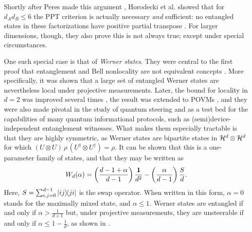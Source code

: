 		Shortly after Peres made this argument \cite{peres_1996_ppt}, Horodecki et al. showed that for $d_A d_B \leq 6$ the PPT criterion is actually necessary \emph{and} sufficient: no entangled states in these factorizations have positive partial transpose \cite{horodecki_1996_ppt}. For larger dimensions, though, they also prove this is not always true; except under special circumstances.
	
		One such special case is that of \emph{Werner states}. They were central to the first proof that entanglement and Bell nonlocality are not equivalent concepts \cite{werner_1989}. More specifically, it was shown that a large set of entangled Werner states are nevertheless local under projective measurements. Later, the bound for locality in $d=2$ was improved several times \cite{acin_2006_grothendieck,vertesi_2008_moreefficient,hirsch_2017_betterlocalhidden}, the result was extended to POVMs \cite{barrett_2002_povmslocality}, and they were also made pivotal in the study of quantum steering \cite{wiseman_2007_steering} and as a test bed for the capabilities of many quantum informational protocols, such as (semi)device-independent entanglement witnesses. What makes them especially tractable is that they are highly symmetric, as Werner states are bipartite states in $\mathcal{H}^{d} \otimes \mathcal{H}^{d}$ for which $(U \otimes U) \,\rho\, (U^\dagger \otimes U^\dagger) = \rho$. It can be shown that this is a one-parameter family of states, and that they may be written as
		\begin{equation}
			W_d(\alpha) = \left( \frac{d-1+\alpha}{d-1} \right) \frac{\mathbf{1}}{d^2} - \left( \frac{\alpha}{d-1} \right) \frac{S}{d} .
			\label{eq:werner-states}
		\end{equation}
		Here, $S = \sum_{i,j=0}^{d-1} \ketbra{ij}{ji}$ is the swap operator. When written in this form, $\alpha = 0$ stands for the maximally mixed state, and $\alpha \leq 1$. Werner states are entangled if and only if $\alpha > \frac{1}{d+1}$ but, under projective measurements, they are unsteerable if and only if $\alpha \leq 1 - \frac{1}{d}$, as shown in \cite{wiseman_2007_steering}. 
	
